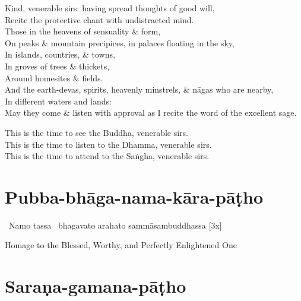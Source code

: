 \begin{leader-pharitvana-english}
  Kind, venerable sirs: having spread thoughts of good will,\\
  Recite the protective chant with undistracted mind.\\
  Those in the heavens of sensuality \& form,\\
  On peaks \& mountain precipices, in palaces floating in the sky,\\
  In islands, countries, \& towns,\\
  In groves of trees \& thickets,\\
  Around homesites \& fields.\\
  And the earth-devas, spirits, heavenly minstrels, \& nāgas who are nearby,\\
  In different waters and lands:\\
  May they come \& listen with approval as I recite the word of the excellent sage.

  This is the time to see the Buddha, venerable sirs.\\
  This is the time to listen to the Dhamma, venerable sirs.\\
  This is the time to attend to the Saṅgha, venerable sirs.
\end{leader-pharitvana-english}

\suttaRef{[Thai]}



\section{Pubba-bhāga-nama-kāra-pāṭho}
\label{pubba-bhaga-nama-kara-patho-protective}


\begin{pali-hangtogether}
  \anglebracketleft\ \hspace{-0.5mm}Namo tassa \hspace{-0.5mm}\anglebracketright\ bhagavato arahato sammāsambuddhassa \hfill{[3x]}
\end{pali-hangtogether}

\begin{english}
  Homage to the Blessed, Worthy, and Perfectly Enlightened One
\end{english}

\suttaRef{[DN 21]}



\section{Saraṇa-gamana-pāṭho}
\label{sarana-gamana-patho}

